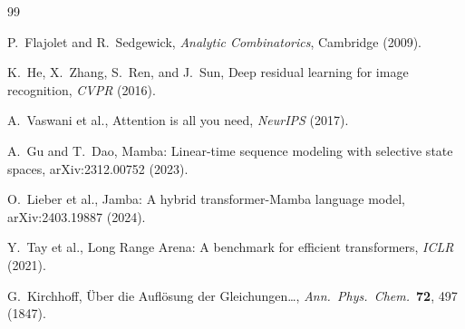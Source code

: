 \documentclass[11pt,a4paper]{article}
\begin{document}
\begin{thebibliography}{99}

P.~Flajolet and R.~Sedgewick,
\emph{Analytic Combinatorics}, Cambridge (2009).

K.~He, X.~Zhang, S.~Ren, and J.~Sun,
\newblock Deep residual learning for image recognition,
\newblock \emph{CVPR} (2016).

A.~Vaswani et al.,
\newblock Attention is all you need,
\newblock \emph{NeurIPS} (2017).

A.~Gu and T.~Dao,
\newblock Mamba: Linear-time sequence modeling with selective state spaces,
\newblock arXiv:2312.00752 (2023).

O.~Lieber et al.,
\newblock Jamba: A hybrid transformer-Mamba language model,
\newblock arXiv:2403.19887 (2024).

Y.~Tay et al.,
\newblock Long Range Arena: A benchmark for efficient transformers,
\newblock \emph{ICLR} (2021).

G.~Kirchhoff,
\newblock \"Uber die Aufl\"osung der Gleichungen\ldots,
\newblock \emph{Ann.\ Phys.\ Chem.}\ \textbf{72}, 497 (1847).

\end{thebibliography}
\end{document}
